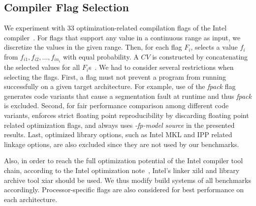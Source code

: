 \subsection{Compiler Flag Selection}

We experiment with 33 optimization-related compilation
flags of the Intel compiler~\cite{icc17manual}.  For flags that
support any value in a continuous range as input, we discretize the
values in the given range.  Then, for each flag $F_i$, \toolname
selects a value $f_i$ from $f_{i1}, f_{i2}, ..., f_{i{n_i}}$ with
equal probability.  A $CV$ is constructed by concatenating the
selected values for all $F_i$s~\cite{opentuner}.  We had to consider
several restrictions when selecting the flags.  First, a flag must not
prevent a program from running successfully on a given target
architecture.  For example, use of the {\em fpack} flag generates code
variants that cause a segmentation fault at runtime and thus {\em fpack } is
excluded.  Second, for fair performance comparison among different
code variants, \toolname enforces strict floating point
reproducibility by discarding floating point related optimization
flags, and always uses {\em -fp-model source } in the presented results.  Last,
optimized library options, such as Intel MKL and IPP
related linkage options, are also excluded since they are not used by
our benchmarks.

Also, in order to reach the full optimization potential of the Intel
compiler tool chain, according to the Intel optimization
note~\cite{iccOpt}, Intel's linker xild and library archive tool xiar
should be used.  We thus modify build systems of all benchmarks
accordingly.
Processor-specific flags are also considered for best performance on
each architecture.

